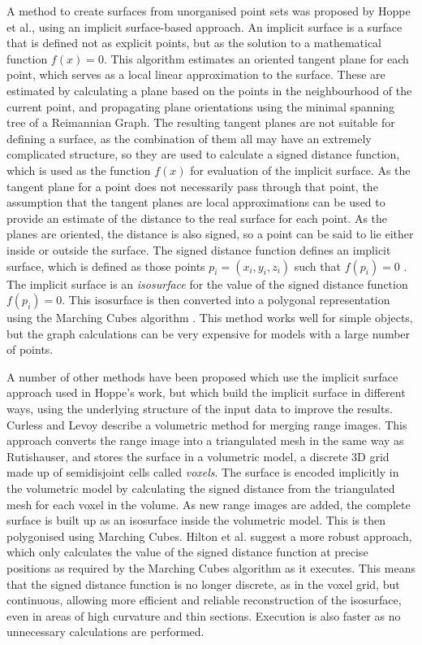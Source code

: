 \documentclass[10pt,oneside,fleqn,a4paper]{book}
\begin{document}
A method to create surfaces from unorganised point sets was proposed by Hoppe et al.\cite{Hoppe92}, using an implicit surface-based approach. An implicit surface is a surface that is defined not as explicit points, but as the solution to a mathematical function $f(x)=0$. This algorithm estimates an oriented tangent plane for each point, which serves as a local linear approximation to the surface. These are estimated by calculating a plane based on the points in the neighbourhood of the current point, and propagating plane orientations using the minimal spanning tree of a Reimannian Graph. The resulting tangent planes are not suitable for defining a surface, as the combination of them all may have an extremely complicated structure, so they are used to calculate a signed distance function, which is used as the function $f(x)$ for evaluation of the implicit surface. As the tangent plane for a point does not necessarily pass through that point, the assumption that the tangent planes are local approximations can be used to provide an estimate of the distance to the real surface for each point. As the planes are oriented, the distance is also signed, so a point can be said to lie either inside or outside the surface. The signed distance function defines an implicit surface, which is defined as those points $p_i=(x_i,y_i,z_i)$ such that $f(p_i)=0$ \cite{Ning93}. The implicit surface is an {\it isosurface} for the value of the signed distance function $f(p_i)=0$. This isosurface is then converted into a polygonal representation using the Marching Cubes algorithm \cite{Lorensen87}. This method works well for simple objects, but the graph calculations can be very expensive for models with a large number of points.

A number of other methods have been proposed which use the implicit surface approach used in Hoppe's work, but which build the implicit surface in different ways, using the underlying structure of the input data to improve the results.  Curless and Levoy \cite{Curless96} describe a volumetric method for merging range images. This approach converts the range image into a triangulated mesh in the same way as Rutishauser, and stores the surface in a volumetric model, a discrete 3D grid made up of semidisjoint cells called {\it voxels}. The surface is encoded implicitly in the volumetric model by calculating the signed distance from the triangulated mesh for each voxel in the volume. As new range images are added, the complete surface is built up as an isosurface inside the volumetric model. This is then polygonised using Marching Cubes. Hilton et al.\cite{Hilton96b} suggest a more robust approach, which only calculates the value of the signed distance function at precise positions as required by the Marching Cubes algorithm as it executes. This means that the signed distance function is no longer discrete, as in the voxel grid, but continuous, allowing more efficient and reliable reconstruction of the isosurface, even in areas of high curvature and thin sections. Execution is also faster as no unnecessary calculations are performed.
\end{document}
